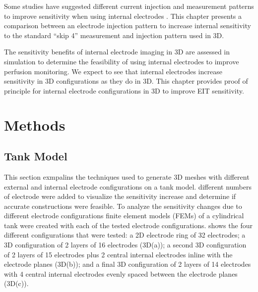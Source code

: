 Some studies have suggested different current injection and measurement patterns
to improve sensitivity when using internal electrodes \parencite{nasehi_tehrani_modelling_2012}.
This chapter presents a comparison between
an electrode injection pattern to increase
internal sensitivity to the standard ``skip 4''
measurement and injection pattern used in 3D.

The sensitivity benefits of internal electrode imaging in 3D are assessed
in simulation to determine the feasibility of using internal electrodes 
to improve perfusion monitoring. 
We expect to see that internal electrodes increase sensitivity in 3D configurations 
as they do in 3D.
This chapter provides proof of principle for internal electrode configurations 
in 3D to 
improve EIT sensitivity.


\section{Methods}

\subsection{Tank Model}
This section exmpalins the techniques used to 
generate 3D meshes with different external and internal 
electrode configurations on a tank model. 
different numbers of electrode were added to visualize the sensitivity increase 
and determine if accurate constructions were feasible. 
To analyze the sensitivity changes due to different electrode 
configurations finite element models (FEMs) of a cylindrical tank were 
created with each of the tested electrode configurations.  shows the four 
different configurations that were tested: a 2D 
electrode ring of 32 electrodes; a 3D configuration of 2 layers of 16 
electrodes (3D(a)); a second 3D configuration of 2 layers of 15 electrodes 
plus 2 central internal electrodes inline with the electrode planes (3D(b)); and a final 3D configuration of 
2 layers of 14 electrodes with 4 central internal electrodes evenly spaced between the electrode planes (3D(c)).

